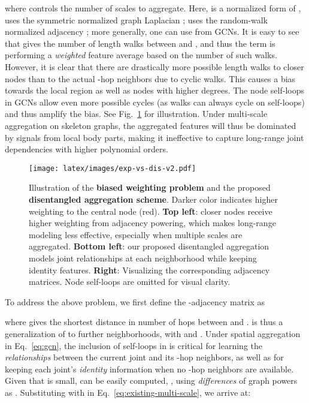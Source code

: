 \documentclass[10pt,twocolumn,letterpaper]{article}
\makeatletter
\renewcommand{\paragraph}{\@startsection{paragraph}{4}{\z@}{1.5ex \@plus 1ex \@minus .2ex}{-1em}{\normalfont\normalsize\bfseries}}
\makeatother
\begin{document}
where  controls the number of scales to aggregate. Here,  is a normalized form of , \eg \cite{st-gcn-concur-18} uses the symmetric normalized graph Laplacian ; \cite{AS-GCN-skeleton-cvpr19} uses the random-walk normalized adjacency ; more generally, one can use  from GCNs.
It is easy to see that  gives the number of length  walks between  and , and thus the term  is performing a \textit{weighted} feature average based on the number of such walks.
However, it is clear that there are drastically more possible length  walks to closer nodes than to the actual -hop neighbors due to cyclic walks. This causes a bias towards the local region as well as nodes with higher degrees. The node self-loops in GCNs allow even more possible cycles (as walks can always cycle on self-loops) and thus amplify the bias. See Fig.~\ref{fig:exp-vs-dis-multi-scale} for illustration.
Under multi-scale aggregation on skeleton graphs, the aggregated features will thus be dominated by signals from local body parts, making it ineffective to capture long-range joint dependencies with higher polynomial orders.


\begin{figure}[t]
\centering
\texttt{[image: latex/images/exp-vs-dis-v2.pdf]}
   \caption{Illustration of the \textbf{biased weighting problem} and the proposed \textbf{disentangled aggregation scheme}. Darker color indicates higher weighting to the central node (\textcolor{BrickRed}{red}). \textbf{Top left}: closer nodes receive higher weighting from adjacency powering, which makes long-range modeling less effective, especially when multiple scales are aggregated. \textbf{Bottom left}: our proposed disentangled aggregation models joint relationships at each neighborhood while keeping identity features. \textbf{Right}: Visualizing the corresponding adjacency matrices. Node self-loops are omitted for visual clarity.}
\label{fig:exp-vs-dis-multi-scale}
\end{figure}


\paragraph{Disentangling Neighborhoods.} \label{sec:disentangling-neighborhoods}

To address the above problem, we first define the -adjacency matrix  as

where  gives the shortest distance in number of hops between  and .  is thus a generalization of  to further neighborhoods, with  and .
Under spatial aggregation in Eq.~\ref{eq:gcn}, the inclusion of self-loops in  is critical for learning the \textit{relationships} between the current joint and its -hop neighbors, as well as for keeping each joint's \textit{identity} information when no -hop neighbors are available. Given that  is small,  can be easily computed,
\eg, using \textit{differences} of graph powers as
.
Substituting  with  in Eq.~\ref{eq:existing-multi-scale}, we arrive at:
\end{document}
